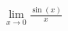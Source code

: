 \documentclass[preview]{standalone}
\begin{document}
\begin{align*}
\lim_{ x  \to 0} \frac{ \sin(x) }{ x }
\end{align*}
\end{document}

